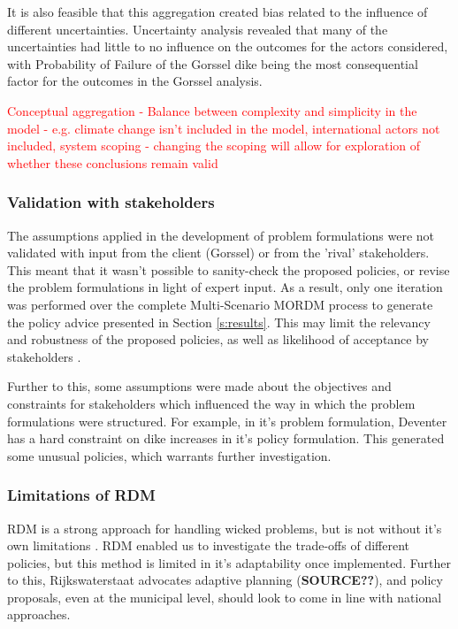 It is also feasible that this aggregation created bias related to the influence of different uncertainties. Uncertainty analysis revealed that many of the uncertainties had little to no influence on the outcomes for the actors considered, with Probability of Failure of the Gorssel dike being the most consequential factor for the outcomes in the Gorssel analysis.

\textcolor{red}{Conceptual aggregation - Balance between complexity and simplicity in the model - e.g. climate change isn't included in the model, international actors not included, system scoping - changing the scoping will allow for exploration of whether these conclusions remain valid}

\subsubsection{Validation with stakeholders}
The assumptions applied in the development of problem formulations were not validated with input from the client (Gorssel) or from the 'rival' stakeholders. This meant that it wasn't possible to sanity-check the proposed policies, or revise the problem formulations in light of expert input. As a result, only one iteration was performed over the complete Multi-Scenario MORDM process to generate the policy advice presented in Section \ref{s:results}. This may limit the relevancy and robustness of the proposed policies, as well as likelihood of acceptance by stakeholders \parencite{quinn_rival_2017}.

Further to this, some assumptions were made about the objectives and constraints for stakeholders which influenced the way in which the problem formulations were structured. For example, in it's problem formulation, Deventer has a hard constraint on dike increases in it's policy formulation. This generated some unusual policies, which warrants further investigation.

\subsubsection{Limitations of RDM}
RDM is a strong approach for handling wicked problems, but is not without it's own limitations \parencite{kwakkel_coping_2016}. RDM enabled us to investigate the trade-offs of different policies, but this method is limited in it's adaptability once implemented. Further to this, Rijkswaterstaat advocates adaptive planning (\textbf{SOURCE??}), and policy proposals, even at the municipal level, should look to come in line with national approaches.

